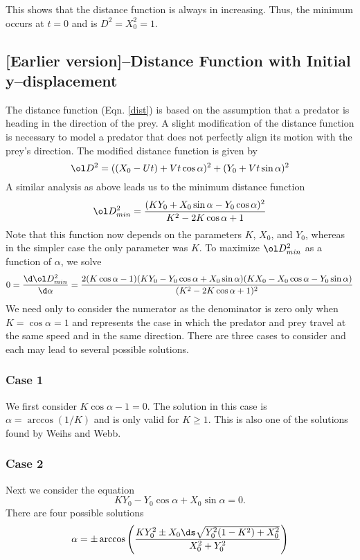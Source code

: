 This shows that the distance function is always in increasing. Thus, the minimum occurs at $t=0$ and is $D^2 = X_0^2 = 1.$

\subsection{[Earlier version]--Distance Function with Initial y--displacement}
The distance function (Eqn. \eqref{dist}) is based on the assumption that a predator is heading in the direction of the prey. A slight modification of the distance function is necessary to model a predator that does not perfectly align its motion with the prey's direction. The modified distance function is given by    
%
\begin{equation}
\ol D^2 = ((X_0 - Ut) + Vt\cos\alpha)^2 + (Y_0 + Vt\sin\alpha)^2
\label{y_dist}
\end{equation}
%
A similar analysis as above leads us to the minimum distance function
%
\begin{equation}
\ol D^2_{min}=\frac{(K Y_0+X_0 \sin \alpha -Y_0\cos \alpha)^2}{K^2-2 K \cos \alpha +1} 
\label{newDmin2}
\end{equation}
%
Note that this function now depends on the parameters $K$, $X_0$, and $Y_0$, whereas in the simpler case the only parameter was $K$. To maximize $\ol D^2_{min}$ as a function of $\alpha$, we solve
% 
\begin{equation}
0 = \frac{\d \ol D^2_{min}}{\d \alpha} = \frac{2(K \cos \alpha - 1)
	(K Y_0 - Y_0 \cos \alpha + X_0 \sin\alpha)(K X_0 - X_0 \cos \alpha - Y_0 \sin \alpha)}
	{(K^2 - 2K \cos \alpha + 1)^2}
\label{newDmin_dalpha}	
\end{equation}
%
We need only to consider the numerator as the denominator is zero only when $K = \cos \alpha = 1$ and represents the case in which the predator and prey travel at the same speed and in the same direction. There are three cases to consider and each may lead to several possible solutions.
% 
\subsubsection{Case 1}
We first consider $K \cos \alpha - 1=0$. The solution in this case is $\alpha = \arccos(1/K)$ and is only valid for $K\geq 1$. This is also one of the solutions found by Weihs and Webb.
%
\subsubsection{Case 2}
Next we consider the equation 
%
\begin{equation}
K Y_0 - Y_0 \cos \alpha + X_0 \sin\alpha = 0.
\end{equation}
%
There are four possible solutions 
%
\begin{equation}
\alpha = \pm \arccos \left( \frac{K Y_0^2 \pm X_0 
\ds\sqrt{Y_0^2(1- K^2) + X_0^2 }}{X_0^2+Y_0^2} \right )
\end{equation}
%	
